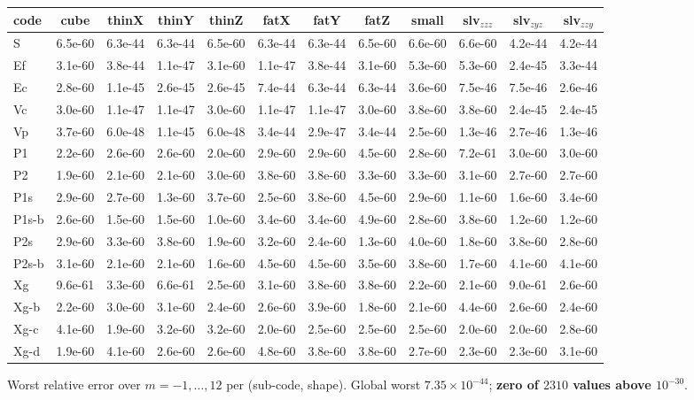 \documentclass[11pt]{article}
\theoremstyle{remark}
\begin{document}
\begin{center}\footnotesize
\begin{tabular}{@{}lccccccccccc@{}}
\toprule
code & cube & thinX & thinY & thinZ & fatX & fatY & fatZ & small & slv$_{zzz}$ & slv$_{zyz}$ & slv$_{zzy}$\\
\midrule
S     & 6.5e-60 & 6.3e-44 & 6.3e-44 & 6.5e-60 & 6.3e-44 & 6.3e-44 & 6.5e-60 & 6.6e-60 & 6.6e-60 & 4.2e-44 & 4.2e-44\\
Ef    & 3.1e-60 & 3.8e-44 & 1.1e-47 & 3.1e-60 & 1.1e-47 & 3.8e-44 & 3.1e-60 & 5.3e-60 & 5.3e-60 & 2.4e-45 & 3.3e-44\\
Ec    & 2.8e-60 & 1.1e-45 & 2.6e-45 & 2.6e-45 & 7.4e-44 & 6.3e-44 & 6.3e-44 & 3.6e-60 & 7.5e-46 & 7.5e-46 & 2.6e-46\\
Vc    & 3.0e-60 & 1.1e-47 & 1.1e-47 & 3.0e-60 & 1.1e-47 & 1.1e-47 & 3.0e-60 & 3.8e-60 & 3.8e-60 & 2.4e-45 & 2.4e-45\\
Vp    & 3.7e-60 & 6.0e-48 & 1.1e-45 & 6.0e-48 & 3.4e-44 & 2.9e-47 & 3.4e-44 & 2.5e-60 & 1.3e-46 & 2.7e-46 & 1.3e-46\\
P1    & 2.2e-60 & 2.6e-60 & 2.6e-60 & 2.0e-60 & 2.9e-60 & 2.9e-60 & 4.5e-60 & 2.8e-60 & 7.2e-61 & 3.0e-60 & 3.0e-60\\
P2    & 1.9e-60 & 2.1e-60 & 2.1e-60 & 3.0e-60 & 3.8e-60 & 3.8e-60 & 3.3e-60 & 3.3e-60 & 3.1e-60 & 2.7e-60 & 2.7e-60\\
P1s   & 2.9e-60 & 2.7e-60 & 1.3e-60 & 3.7e-60 & 2.5e-60 & 3.8e-60 & 4.5e-60 & 2.9e-60 & 1.1e-60 & 1.6e-60 & 3.4e-60\\
P1s-b & 2.6e-60 & 1.5e-60 & 1.5e-60 & 1.0e-60 & 3.4e-60 & 3.4e-60 & 4.9e-60 & 2.8e-60 & 3.8e-60 & 1.2e-60 & 1.2e-60\\
P2s   & 2.9e-60 & 3.3e-60 & 3.8e-60 & 1.9e-60 & 3.2e-60 & 2.4e-60 & 1.3e-60 & 4.0e-60 & 1.8e-60 & 3.8e-60 & 2.8e-60\\
P2s-b & 3.1e-60 & 2.1e-60 & 2.1e-60 & 1.6e-60 & 4.5e-60 & 4.5e-60 & 3.5e-60 & 3.8e-60 & 1.7e-60 & 4.1e-60 & 4.1e-60\\
Xg    & 9.6e-61 & 3.3e-60 & 6.6e-61 & 2.5e-60 & 3.1e-60 & 3.8e-60 & 3.8e-60 & 2.2e-60 & 2.1e-60 & 9.0e-61 & 2.6e-60\\
Xg-b  & 2.2e-60 & 3.0e-60 & 3.1e-60 & 2.4e-60 & 2.6e-60 & 3.9e-60 & 1.8e-60 & 2.1e-60 & 4.4e-60 & 2.6e-60 & 2.4e-60\\
Xg-c  & 4.1e-60 & 1.9e-60 & 3.2e-60 & 3.2e-60 & 2.0e-60 & 2.5e-60 & 2.5e-60 & 2.5e-60 & 2.0e-60 & 2.0e-60 & 2.8e-60\\
Xg-d  & 1.9e-60 & 4.1e-60 & 2.6e-60 & 2.6e-60 & 4.8e-60 & 3.8e-60 & 3.8e-60 & 2.7e-60 & 2.3e-60 & 2.3e-60 & 3.1e-60\\
\bottomrule
\end{tabular}
\end{center}
\noindent
Worst relative error over $m = -1,\ldots,12$ per (sub-code, shape). Global worst
$7.35\times10^{-44}$; \textbf{zero of $2310$ values above $10^{-30}$}.
\end{document}
